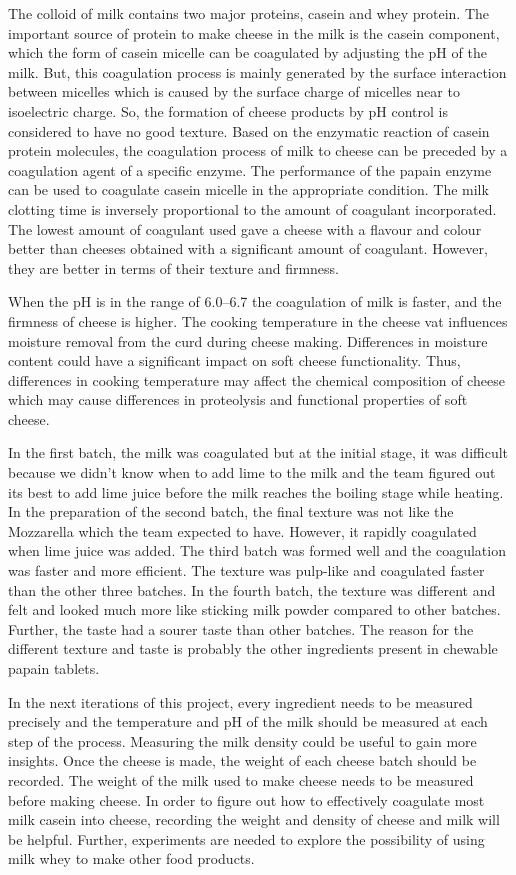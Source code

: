\documentclass[12pt]{article}
\begin{document}
The colloid of milk contains two major proteins, casein and whey protein. The important source of protein to make cheese in the milk is the casein component, which the form of casein micelle can be coagulated by adjusting the pH of the milk. But, this coagulation process is mainly generated by the surface interaction between micelles which is caused by the surface charge of micelles near to isoelectric charge. So, the formation of cheese products by pH control is considered to have no good texture. Based on the enzymatic reaction of casein protein molecules, the coagulation process of milk to cheese can be preceded by a coagulation agent of a specific enzyme. The performance of the papain enzyme can be used to coagulate casein micelle in the appropriate condition. The milk clotting time is inversely proportional to the amount of coagulant incorporated. The lowest amount of coagulant used gave a cheese with a flavour and colour better than cheeses obtained with a significant amount of coagulant. However, they are better in terms of their texture and firmness. 

When the pH is in the range of 6.0–6.7  the coagulation of milk is faster, and the firmness of cheese is higher. The cooking temperature in the cheese vat influences moisture removal from the curd during cheese making. Differences in moisture content could have a significant impact on soft cheese functionality. Thus, differences in cooking temperature may affect the chemical composition of cheese which may cause differences in proteolysis and functional properties of soft cheese.

In the first batch, the milk was coagulated but at the initial stage, it was difficult because we didn’t know when to add lime to the milk and the team figured out its best to add lime juice before the milk reaches the boiling stage while heating. In the preparation of the second batch, the final texture was not like the Mozzarella which the team expected to have. However, it rapidly coagulated when lime juice was added.  The third batch was formed well and the coagulation was faster and more efficient. The texture was pulp-like and coagulated faster than the other three batches. In the fourth batch, the texture was different and felt and looked  much more like sticking milk powder compared to other batches. Further, the taste had a sourer taste than other batches. The reason for the different texture and taste is probably the other ingredients present in chewable papain tablets.


In the next iterations of this project, every ingredient needs to be measured precisely and the temperature and pH of the milk should be measured at each step of the process. Measuring the milk density could be useful to gain more insights.  Once the cheese is made, the weight of each cheese batch should  be recorded. The weight of the milk used to make cheese needs to be measured before making cheese.  In order to figure out how to effectively coagulate most milk casein into cheese, recording the weight and density of cheese and milk will be helpful. Further, experiments are needed to explore the possibility of using milk whey to make other food products.        	
    
\end{document}
